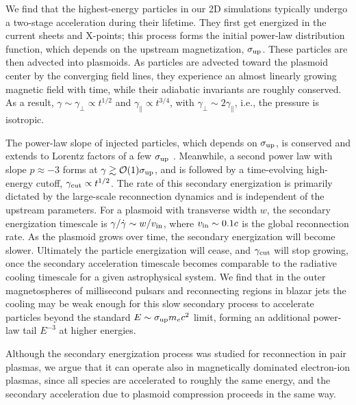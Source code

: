 We find that the highest-energy particles in our 2D simulations typically undergo a two-stage acceleration during their lifetime. They first get energized in the current sheets and X-points; this process forms the initial power-law distribution function, which depends on the upstream magnetization, $\sigma_{\rm up}$. These particles are then advected into plasmoids. As particles are advected toward the plasmoid center by the converging field lines, they experience an almost linearly growing magnetic field with time, while their adiabatic invariants are roughly conserved. As a result, $\gamma\sim \gamma_\perp \propto t^{1/2}$ and $\gamma_{\parallel} \propto t^{3/4}$, with $\gamma_\perp \sim 2\gamma_{\parallel}$, i.e., the pressure is isotropic. 


The power-law slope of injected particles, which depends on $\sigma_{\rm up}$, is conserved and extends to Lorentz factors of a few $\sigma_{\rm up}$ \citep{2016ApJ...816L...8W}. Meanwhile, a second power law with slope $p\approx -3$ forms at $\gamma\gtrsim \mathcal{O}(1)\sigma_{\rm up}$, and is followed by a time-evolving high-energy cutoff, $\gamma_{\rm cut}\propto t^{1/2}$. The rate of this secondary energization is primarily dictated by the large-scale reconnection dynamics and is independent of the upstream parameters. For a plasmoid with transverse width $w$, the secondary energization timescale is $\gamma/\dot{\gamma} \sim w / v_{\rm in}$, where $v_{\rm in}\sim 0.1 c$ is the global reconnection rate. As the plasmoid grows over time, the secondary energization will become slower. Ultimately the particle energization will cease, and $\gamma_{\rm cut}$ will stop growing, once the secondary acceleration timescale becomes comparable to the radiative cooling timescale for a given astrophysical system. We find that in the outer magnetospheres of millisecond pulsars and reconnecting regions in blazar jets the cooling may be weak enough for this slow secondary process to accelerate particles beyond the standard $E\sim \sigma_{\rm up} m_e c^2$ limit, forming an additional power-law tail $E^{-3}$ at higher energies. 

Although the secondary energization process was studied for reconnection in pair plasmas, we argue that it can operate also in magnetically dominated electron-ion plasmas, since all species are accelerated to roughly the same energy, and the secondary acceleration due to plasmoid compression proceeds in the same way.
